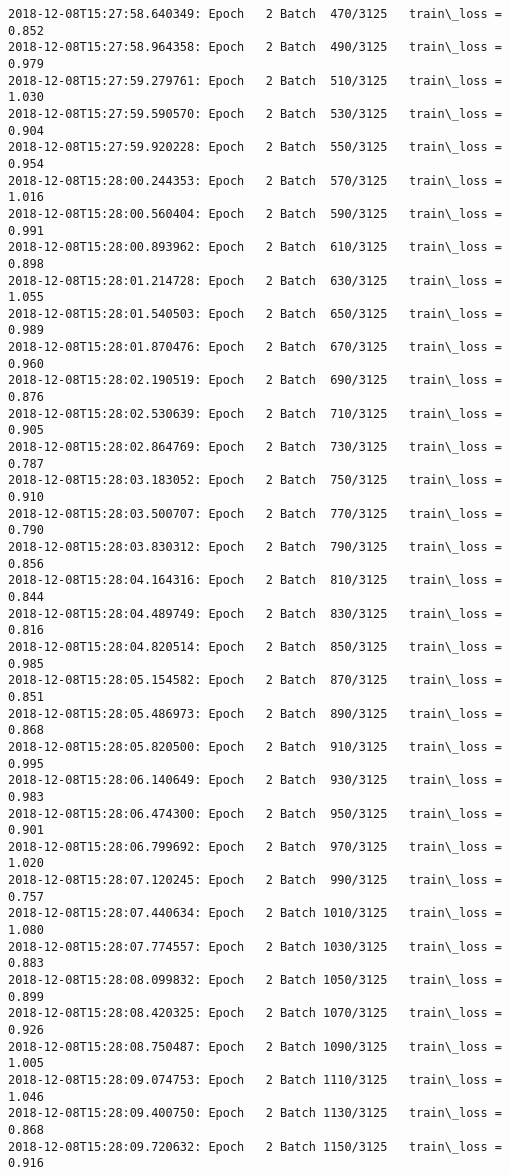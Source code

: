 \documentclass[11pt]{article}
\begin{document}
\begin{Verbatim}[commandchars=\\\{\}]
2018-12-08T15:27:58.640349: Epoch   2 Batch  470/3125   train\_loss = 0.852
2018-12-08T15:27:58.964358: Epoch   2 Batch  490/3125   train\_loss = 0.979
2018-12-08T15:27:59.279761: Epoch   2 Batch  510/3125   train\_loss = 1.030
2018-12-08T15:27:59.590570: Epoch   2 Batch  530/3125   train\_loss = 0.904
2018-12-08T15:27:59.920228: Epoch   2 Batch  550/3125   train\_loss = 0.954
2018-12-08T15:28:00.244353: Epoch   2 Batch  570/3125   train\_loss = 1.016
2018-12-08T15:28:00.560404: Epoch   2 Batch  590/3125   train\_loss = 0.991
2018-12-08T15:28:00.893962: Epoch   2 Batch  610/3125   train\_loss = 0.898
2018-12-08T15:28:01.214728: Epoch   2 Batch  630/3125   train\_loss = 1.055
2018-12-08T15:28:01.540503: Epoch   2 Batch  650/3125   train\_loss = 0.989
2018-12-08T15:28:01.870476: Epoch   2 Batch  670/3125   train\_loss = 0.960
2018-12-08T15:28:02.190519: Epoch   2 Batch  690/3125   train\_loss = 0.876
2018-12-08T15:28:02.530639: Epoch   2 Batch  710/3125   train\_loss = 0.905
2018-12-08T15:28:02.864769: Epoch   2 Batch  730/3125   train\_loss = 0.787
2018-12-08T15:28:03.183052: Epoch   2 Batch  750/3125   train\_loss = 0.910
2018-12-08T15:28:03.500707: Epoch   2 Batch  770/3125   train\_loss = 0.790
2018-12-08T15:28:03.830312: Epoch   2 Batch  790/3125   train\_loss = 0.856
2018-12-08T15:28:04.164316: Epoch   2 Batch  810/3125   train\_loss = 0.844
2018-12-08T15:28:04.489749: Epoch   2 Batch  830/3125   train\_loss = 0.816
2018-12-08T15:28:04.820514: Epoch   2 Batch  850/3125   train\_loss = 0.985
2018-12-08T15:28:05.154582: Epoch   2 Batch  870/3125   train\_loss = 0.851
2018-12-08T15:28:05.486973: Epoch   2 Batch  890/3125   train\_loss = 0.868
2018-12-08T15:28:05.820500: Epoch   2 Batch  910/3125   train\_loss = 0.995
2018-12-08T15:28:06.140649: Epoch   2 Batch  930/3125   train\_loss = 0.983
2018-12-08T15:28:06.474300: Epoch   2 Batch  950/3125   train\_loss = 0.901
2018-12-08T15:28:06.799692: Epoch   2 Batch  970/3125   train\_loss = 1.020
2018-12-08T15:28:07.120245: Epoch   2 Batch  990/3125   train\_loss = 0.757
2018-12-08T15:28:07.440634: Epoch   2 Batch 1010/3125   train\_loss = 1.080
2018-12-08T15:28:07.774557: Epoch   2 Batch 1030/3125   train\_loss = 0.883
2018-12-08T15:28:08.099832: Epoch   2 Batch 1050/3125   train\_loss = 0.899
2018-12-08T15:28:08.420325: Epoch   2 Batch 1070/3125   train\_loss = 0.926
2018-12-08T15:28:08.750487: Epoch   2 Batch 1090/3125   train\_loss = 1.005
2018-12-08T15:28:09.074753: Epoch   2 Batch 1110/3125   train\_loss = 1.046
2018-12-08T15:28:09.400750: Epoch   2 Batch 1130/3125   train\_loss = 0.868
2018-12-08T15:28:09.720632: Epoch   2 Batch 1150/3125   train\_loss = 0.916

\end{Verbatim}
\end{document}
